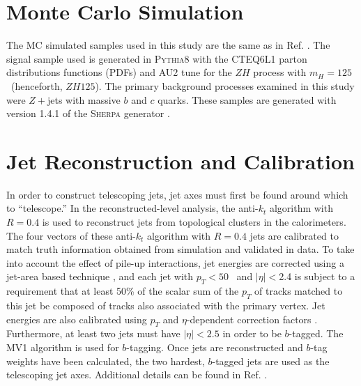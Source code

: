 \section{Monte Carlo Simulation}
\label{sec:mc}
The MC simulated samples used in this study are the same as in Ref. \cite{conf}.  The signal sample used is generated in \textsc{Pythia8} \cite{conf18} with the CTEQ6L1 parton distributions functions (PDFs) and AU2 tune\cite{conf19,conf20,conf21} for the $ZH$ process with $m_H=125$ \GeV\ (henceforth, $ZH125$).  The primary background processes examined in this study were $Z+$jets with massive $b$ and $c$ quarks.  These samples are generated with version 1.4.1 of the \textsc{Sherpa} generator \cite{conf28}.%

\section{Jet Reconstruction and Calibration}
\label{sec:cal}
In order to construct telescoping jets, jet axes must first be found around which to ``telescope.''  In the reconstructed-level analysis, the anti-$k_t$ algorithm with $R=0.4$ is used to reconstruct jets from topological clusters in the calorimeters.  The four vectors of these anti-$k_t$ algorithm with $R=0.4$ jets are calibrated to match truth information obtained from simulation and validated in data.  To take into account the effect of pile-up interactions, jet energies are corrected using a jet-area based technique \cite{conf54}, and each jet with $p_T<50$ \GeV\ and $\left|\eta\right|<$2.4 is subject to a requirement that at least 50\% of the scalar sum of the $p_T$ of tracks matched to this jet be composed of tracks also associated with the primary vertex.  Jet energies are also calibrated using $p_T$ and $\eta$-dependent correction factors \cite{conf55}.  Furthermore, at least two jets must have $\left|\eta\right|<2.5$ in order to be $b$-tagged.  The MV1 algorithm \cite{conf56,conf57,conf58,conf59,conf60} is used for $b$-tagging.  Once jets are reconstructed and $b$-tag weights have been calculated, the two hardest, $b$-tagged jets are used as the telescoping jet axes.  Additional details can be found in Ref. \cite{conf}.

